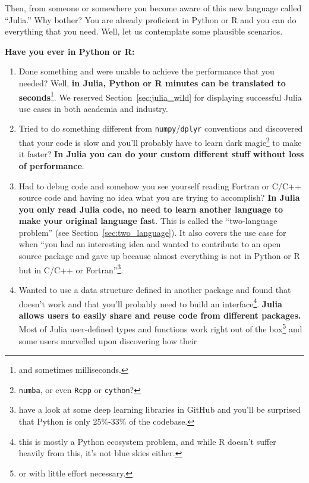\documentclass[
  notoc %
]{tufte-book}
\newcommand{\passthrough}[1]{#1}
\begin{document}
Then, from someone or somewhere you become aware of this new language
called ``Julia.'' Why bother? You are already proficient in Python or R
and you can do everything that you need. Well, let us contemplate some
plausible scenarios.

\textbf{Have you ever in Python or R:}

\begin{enumerate}
\def\labelenumi{\arabic{enumi}.}
\item
  Done something and were unable to achieve the performance that you
  needed? Well, \textbf{in Julia, Python or R minutes can be translated
  to seconds}\footnote{and sometimes milliseconds.}. We reserved
  Section~\ref{sec:julia_wild} for displaying successful Julia use cases
  in both academia and industry.
\item
  Tried to do something different from
  \passthrough{\lstinline!numpy!}/\passthrough{\lstinline!dplyr!}
  conventions and discovered that your code is slow and you'll probably
  have to learn dark magic\footnote{\passthrough{\lstinline!numba!}, or
    even \passthrough{\lstinline!Rcpp!} or
    \passthrough{\lstinline!cython!}?} to make it faster? \textbf{In
  Julia you can do your custom different stuff without loss of
  performance}.
\item
  Had to debug code and somehow you see yourself reading Fortran or
  C/C++ source code and having no idea what you are trying to
  accomplish? \textbf{In Julia you only read Julia code, no need to
  learn another language to make your original language fast}. This is
  called the ``two-language problem'' (see
  Section~\ref{sec:two_language}). It also covers the use case for when
  ``you had an interesting idea and wanted to contribute to an open
  source package and gave up because almost everything is not in Python
  or R but in C/C++ or Fortran''\footnote{have a look at some deep
    learning libraries in GitHub and you'll be surprised that Python is
    only 25\%-33\% of the codebase.}.
\item
  Wanted to use a data structure defined in another package and found
  that doesn't work and that you'll probably need to build an
  interface\footnote{this is mostly a Python ecosystem problem, and
    while R doesn't suffer heavily from this, it's not blue skies
    either.}. \textbf{Julia allows users to easily share and reuse code
  from different packages.} Most of Julia user-defined types and
  functions work right out of the box\footnote{or with little effort
    necessary.} and some users marvelled upon discovering how their

\end{enumerate}
\end{document}

